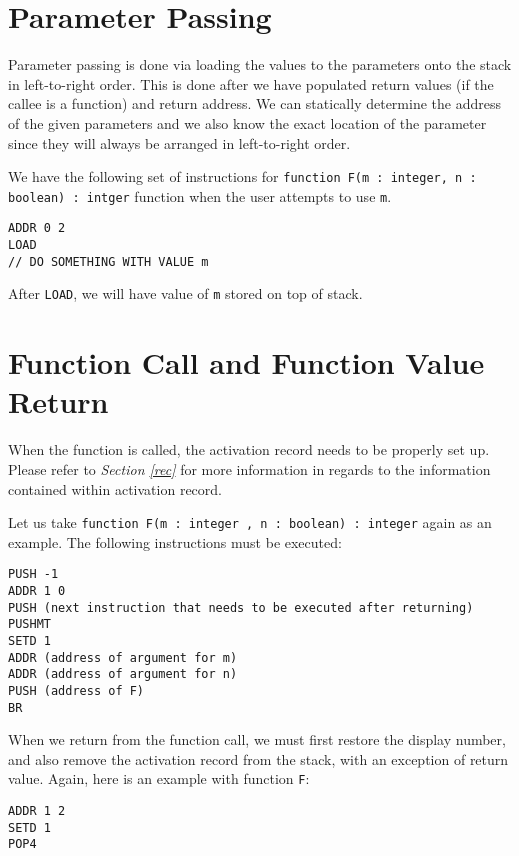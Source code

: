 \documentclass{article}
\begin{document}
\section{Parameter Passing}

Parameter passing is done via loading the values to the parameters onto the stack in left-to-right order. This is done after we have populated return values (if the callee is a function) and return address. We can statically determine the address of the given parameters and we also know the exact location of the parameter since they will always be arranged in left-to-right order.

We have the following set of instructions for {\tt function F(m : integer, n : boolean) : intger} function when the user attempts to use {\tt m}.

\begin{lstlisting}
ADDR 0 2
LOAD
// DO SOMETHING WITH VALUE m
\end{lstlisting}

After {\tt LOAD}, we will have value of {\tt m} stored on top of stack.

\section{Function Call and Function Value Return}

When the function is called, the activation record needs to be properly set up. Please refer to {\it Section \ref{rec}} for more information in regards to the information contained within activation record.

Let us take {\tt function F(m : integer , n : boolean) : integer} again as an example. The following instructions must be executed:

\begin{lstlisting}
PUSH -1
ADDR 1 0
PUSH (next instruction that needs to be executed after returning)
PUSHMT
SETD 1
ADDR (address of argument for m)
ADDR (address of argument for n)
PUSH (address of F)
BR
\end{lstlisting}

When we return from the function call, we must first restore the display number, and also remove the activation record from the stack, with an exception of return value. Again, here is an example with function {\tt F}:

\begin{lstlisting}
ADDR 1 2
SETD 1
POP4
\end{lstlisting}
\end{document}
